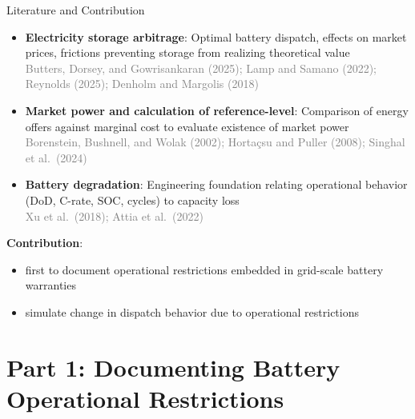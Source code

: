 \documentclass[aspectratio=169]{beamer}
\begin{document}
\begin{frame}{Literature and Contribution}
\begin{itemize}
    \item \textbf{Electricity storage arbitrage}: Optimal battery dispatch, effects on market prices, frictions preventing storage from realizing theoretical value \\
    \textcolor{gray}{\small Butters, Dorsey, and Gowrisankaran (2025); Lamp and Samano (2022); Reynolds (2025); Denholm and Margolis (2018)}
    \item \textbf{Market power and calculation of reference-level}: Comparison of energy offers against marginal cost to evaluate existence of market power \\
    \textcolor{gray}{\small Borenstein, Bushnell, and Wolak (2002); Horta\c{c}su and Puller (2008); Singhal et al.\ (2024)}
    \item \textbf{Battery degradation}: Engineering foundation relating operational behavior (DoD, C-rate, SOC, cycles) to capacity loss \\
    \textcolor{gray}{\small Xu et al.\ (2018); Attia et al.\ (2022)}
\end{itemize}
\textbf{Contribution}:
\begin{itemize}
    \item first to document operational restrictions embedded in grid-scale battery warranties
    \item simulate change in dispatch behavior due to operational restrictions
\end{itemize}
\end{frame}



\section{Part 1: Documenting Battery Operational Restrictions}
\end{document}
